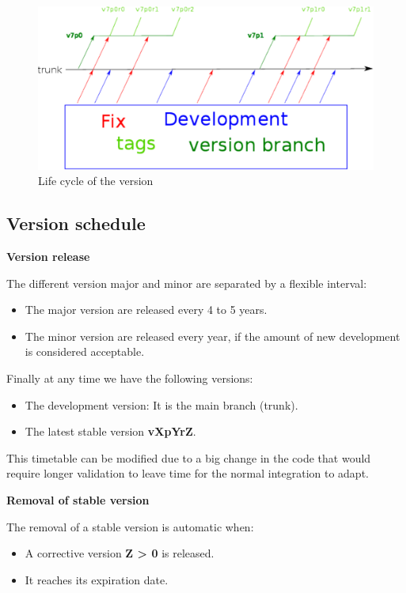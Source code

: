 \begin{figure}[H]
\centering
\includegraphics[scale=.5]{graphics/svn-cycle.pdf}
\caption{\label{fig_lifecycle}Life cycle of the \telemacsystem{} version}
\end{figure}

\subsection{Version schedule}

\textbf{Version release}

The different version major and minor are separated by a flexible interval:
\begin{itemize}
\item The major version are released every 4 to 5 years.
\item The minor version are released every year, if the amount of new
  development is considered acceptable.
\end{itemize}

Finally at any time we have the following versions:
\begin{itemize}
\item The development version: It is the main branch (trunk).
\item The latest stable version \textbf{vXpYrZ}.
\end{itemize}

This timetable can be modified due to a big change in the code that would
require longer validation to leave time for the normal integration to adapt.

\textbf{Removal of stable version}

The removal of a stable version is automatic when:
\begin{itemize}
  \item A corrective version \textbf{Z > 0} is released.
\item It reaches its expiration date.
\end{itemize}


